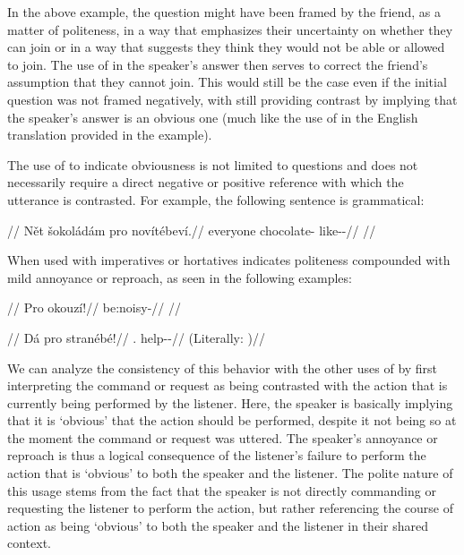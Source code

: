 In the above example, the question might have been framed by the friend, as a
matter of politeness, in a way that emphasizes their uncertainty on whether they
can join or in a way that suggests they think they would not be able or allowed
to join. The use of  in the speaker's answer then serves to correct the
friend's assumption that they cannot join. This would still be the case even if
the initial question was not framed negatively, with  still providing
contrast by implying that the speaker's answer is an obvious one (much like the
use of  in the English translation provided in the example).

The use of  to indicate obviousness is not limited to questions and
does not necessarily require a direct negative or positive reference with which
the utterance is contrasted. For example, the following sentence is grammatical:

\pex
\begingl
	\glpreamble {}//
	\gla Nět šokoládám pro novítébeví.//
	\glb everyone chocolate-\Agt{} \Cntr{} like-\Ben{}-\Cont{}//
	\glft {}//
\endgl
\xe

When used with imperatives or hortatives  indicates politeness
compounded with mild annoyance or reproach, as seen in the following examples:

\pex
\begingl
	\glpreamble {}//
	\gla Pro okouzí!//
	\glb \Cntr{} be:noisy-\N{}\Imp{}//
	\glft {}//
\endgl
\xe

\pex
\begingl
	\glpreamble {}//
	\gla Dá pro stranébé!//
	\glb \First.\Sg{} \Cntr{} help-\Ben{}-\Hort{}//
	\glft {} (Literally: )//
\endgl
\xe

We can analyze the consistency of this behavior with the other uses of 
by first interpreting the command or request as being contrasted with the action
that is currently being performed by the listener. Here, the speaker is
basically implying that it is `obvious' that the action should be performed,
despite it not being so at the moment the command or request was uttered. The
speaker's annoyance or reproach is thus a logical consequence of the listener's
failure to perform the action that is `obvious' to both the speaker and the
listener. The polite nature of this usage stems from the fact that the speaker
is not directly commanding or requesting the listener to perform the action, but
rather referencing the course of action as being `obvious' to both the speaker
and the listener in their shared context.

